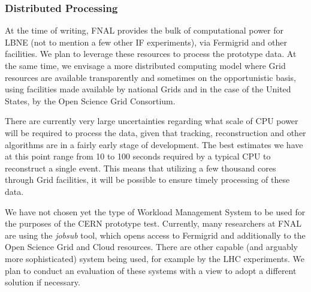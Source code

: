\subsubsection{Distributed Processing}
At the time of writing, FNAL provides the bulk of computational power for LBNE (not to mention a few other IF experiments), via Fermigrid and other facilities.
We plan to leverage these resources to process the prototype data. At the same time, we envisage a more distributed computing model where Grid resources
are available transparently and sometimes on the opportunistic basis, using facilities made available by national Grids and in the case of the United States, by
the Open Science Grid Consortium.

There are currently very large uncertainties regarding what scale of CPU power will be required to process the data, given that tracking, reconstruction and
other algorithms are in a fairly early stage of development. The best estimates we have at this point range from 10 to 100 seconds required by a typical
CPU to reconstruct a single event. This means that utilizing a few thousand cores through Grid facilities, it will be possible to ensure timely processing of these data.

We have not chosen yet the type of Workload Management System to be used for the purposes of the CERN prototype test. Currently, many researchers at FNAL
are using the \textit{jobsub} tool, which opens access to Fermigrid and additionally to the Open Science Grid and Cloud resources. There are other capable (and arguably
more sophisticated) system being used, for example by the LHC experiments. We plan to conduct an evaluation of these systems with a view to adopt a different
solution if necessary.





